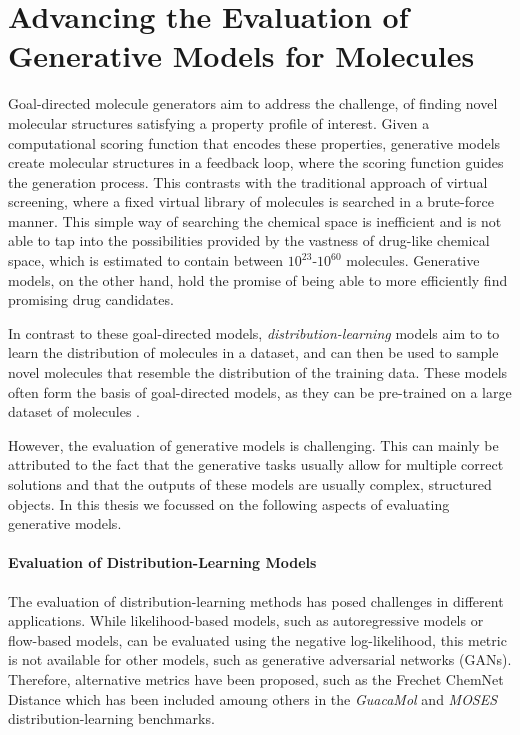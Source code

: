 \section{Advancing the Evaluation of Generative Models for Molecules}
{Goal-directed molecule generators} aim to address the challenge, of finding novel
molecular structures satisfying a property profile of interest. Given a computational scoring
function that encodes these properties, generative models create molecular
structures in a feedback loop, where the scoring function guides the generation
process. This contrasts with the traditional approach of virtual screening, where
a fixed virtual library of molecules is searched in a brute-force manner. This simple way 
of searching the chemical space is inefficient and is not able to 
tap into the possibilities provided by the vastness of drug-like chemical space, which is 
estimated to contain between $10^{23}$-$10^{60}$ molecules.
Generative models, on the other hand, hold the promise of being able to more efficiently find
promising drug candidates.

In contrast to these goal-directed models, \emph{distribution-learning} models aim to 
to learn the distribution of molecules in a dataset, and can then be used to 
sample novel molecules that resemble the distribution of the training data.
These models often form the basis of goal-directed models, as they can be pre-trained on a large
dataset of molecules \citep{segler,reinvent}. 

However, the evaluation of generative models is challenging. This can mainly be attributed to
the fact that the generative tasks usually allow for multiple correct solutions and 
that the outputs of these models are usually complex, structured objects. 
In this thesis we focussed on the following aspects of evaluating generative models.

\paragraph{Evaluation of Distribution-Learning Models} The evaluation of distribution-learning
methods has posed challenges in different applications. While likelihood-based models, such as 
autoregressive models or flow-based models, can be evaluated using the negative log-likelihood, 
this metric is not available for other models, such as generative adversarial networks (GANs).
Therefore, alternative metrics have been proposed, such as the Frechet ChemNet Distance \citep{preuerFrechetChemNetDistance2018}
which has been included amoung others in the \emph{GuacaMol} \citep{brownGuacaMolBenchmarkingModels2019}
and \emph{MOSES} \citep{polykovskiyMolecularSets2018} distribution-learning benchmarks.

